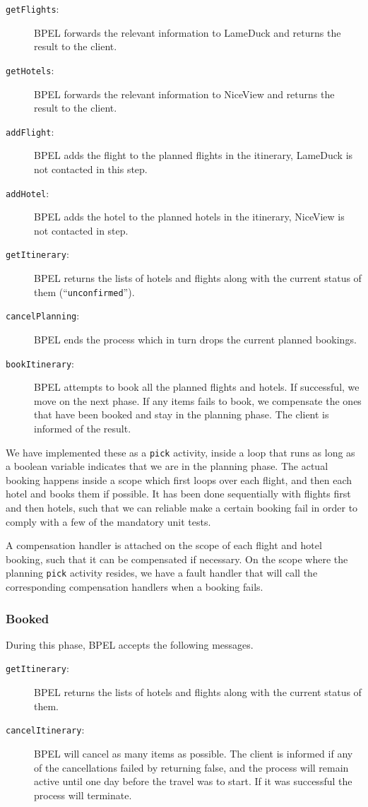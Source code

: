 \begin{description}
\item [\texttt{getFlights}:] BPEL forwards the relevant information to LameDuck and returns the result to the client.
\item [\texttt{getHotels}:] BPEL forwards the relevant information to NiceView and returns the result to the client.
\item [\texttt{addFlight}:] BPEL adds the flight to the planned flights in the itinerary, LameDuck is not contacted in this step.
\item [\texttt{addHotel}:] BPEL adds the hotel to the planned hotels in the itinerary, NiceView is not contacted in step.
\item [\texttt{getItinerary}:] BPEL returns the lists of hotels and flights along with the current status of them (``\texttt{unconfirmed}'').
\item [\texttt{cancelPlanning}:] BPEL ends the process which in turn drops the current planned bookings.
\item [\texttt{bookItinerary}:] BPEL attempts to book all the planned flights and hotels. If successful, we move on the next phase. If any items fails to book, we compensate the ones that have been booked and stay in the planning phase. The client is informed of the result.
\end{description}

We have implemented these as a \texttt{pick} activity, inside a loop that runs as long as a boolean variable indicates that we are in the planning phase. The actual booking happens inside a scope which first loops over each flight, and then each hotel and books them if possible. It has been done sequentially with flights first and then hotels, such that we can reliable make a certain booking fail in order to comply with a few of the mandatory unit tests. 

A compensation handler is attached on the scope of each flight and hotel booking, such that it can be compensated if necessary. On the scope where the planning \texttt{pick} activity resides, we have a fault handler that will call the corresponding compensation handlers when a booking fails.

\subsubsection{Booked}
During this phase, BPEL accepts the following messages.

\begin{description}
\item [\texttt{getItinerary}:] BPEL returns the lists of hotels and flights along with the current status of them.
\item [\texttt{cancelItinerary}:] BPEL will cancel as many items as possible. The client is informed if any of the cancellations failed by returning false, and the process will remain active until one day before the travel was to start. If it was successful the process will terminate.
\end{description}

